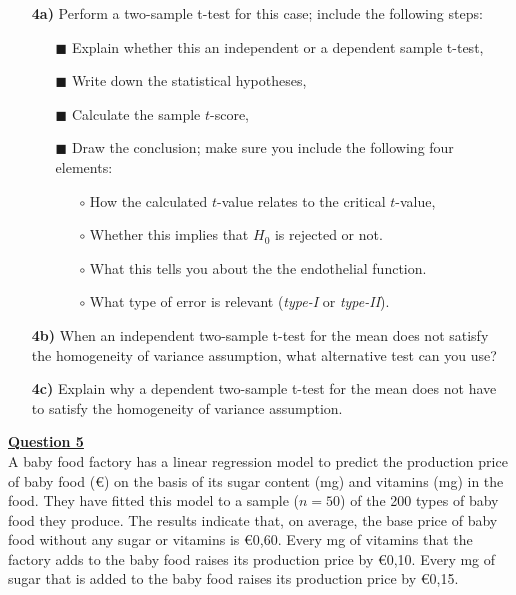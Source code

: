 \begin{itemize}

    \item[\textbf{4a)}] Perform a two-sample t-test for this case; include the following steps: 
    \begin{itemize}
        \item[$\blacksquare$] Explain whether this an independent or a dependent sample t-test,
        \item[$\blacksquare$] Write down the statistical hypotheses, 
        \item[$\blacksquare$] Calculate the sample $t$-score,
        \item[$\blacksquare$] Draw the conclusion; make sure you include the following four elements: 
        \begin{itemize}
            \item[$\circ$] How the calculated $t$-value relates to the critical $t$-value,
            \item[$\circ$] Whether this implies that $H_0$ is rejected or not.
            \item[$\circ$] What this tells you about the the endothelial function.
            \item[$\circ$] What type of error is relevant (\textit{type-I} or \textit{type-II}).
        \end{itemize}
    \end{itemize}
    
    \item[\textbf{4b)}] When an independent two-sample t-test for the mean does not satisfy the homogeneity of variance assumption, what alternative test can you use?
    
    \item[\textbf{4c)}] Explain why a dependent two-sample t-test for the mean does not have to satisfy the homogeneity of variance assumption.
    
\end{itemize}

\underline{\textbf{Question 5}} \\

A baby food factory has a linear regression model to predict the production price of baby food (\euro) on the basis of its sugar content (mg) and vitamins (mg) in the food. They have fitted this model to a sample ($n = 50$) of the 200 types of baby food they produce. The results indicate that, on average, the base price of baby food without any sugar or vitamins is \euro 0,60. Every mg of vitamins that the factory adds to the baby food raises its production price by \euro 0,10. Every mg of sugar that is added to the baby food raises its production price by \euro 0,15. 


